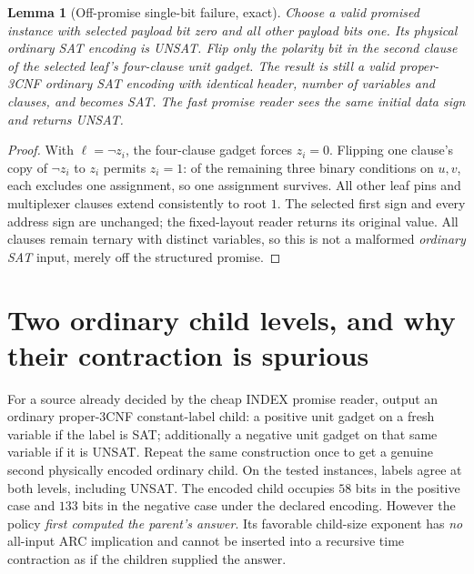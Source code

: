 \documentclass[11pt]{article}
\newtheorem{lemma}[theorem]{Lemma}
\begin{document}
\begin{lemma}[Off-promise single-bit failure, exact]
Choose a valid promised instance with selected payload bit zero and all other payload bits one. Its physical ordinary SAT encoding is UNSAT. Flip \emph{only} the polarity bit in the \emph{second} clause of the selected leaf's four-clause unit gadget. The result is still a valid proper-3CNF ordinary SAT encoding with identical header, number of variables and clauses, and becomes SAT. The fast promise reader sees the same initial data sign and returns UNSAT.
\end{lemma}
\begin{proof}
With $\ell=\neg z_i$, the four-clause gadget forces $z_i=0$. Flipping one clause's copy of $\neg z_i$ to $z_i$ permits $z_i=1$: of the remaining three binary conditions on $u,v$, each excludes one assignment, so one assignment survives. All other leaf pins and multiplexer clauses extend consistently to root $1$. The selected first sign and every address sign are unchanged; the fixed-layout reader returns its original value. All clauses remain ternary with distinct variables, so this is not a malformed \emph{ordinary SAT} input, merely off the structured promise.
\end{proof}

\section{Two ordinary child levels, and why their contraction is spurious}
For a source already decided by the cheap INDEX promise reader, output an ordinary proper-3CNF constant-label child: a positive unit gadget on a fresh variable if the label is SAT; additionally a negative unit gadget on that same variable if it is UNSAT. Repeat the same construction once to get a genuine second physically encoded ordinary child. On the tested instances, labels agree at both levels, including UNSAT. The encoded child occupies $58$ bits in the positive case and $133$ bits in the negative case under the declared encoding. However the policy \emph{first computed the parent's answer}. Its favorable child-size exponent has \emph{no} all-input ARC implication and cannot be inserted into a recursive time contraction as if the children supplied the answer.
\end{document}
